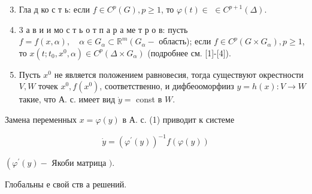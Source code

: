 \documentclass[10pt]{article}
\begin{document}
\begin{enumerate}

  \setcounter{enumi}{2}

  \item Гла д ко с т ь: если $f \in C^{p}(G), p \geqslant 1$, то $\varphi(t) \in$ $\in C^{p+1}(\Delta)$.



  \item 3 а в и и мо с т ь о т п а р а ме т р о в: пусть $f=f(x, \alpha), \quad \alpha \in G_{\alpha} \subset \mathbb{R}^{m}\left(G_{\alpha}-\right.$ область); если $f \in C^{p}\left(G \times G_{\alpha}\right), p \geqslant 1$, то $x\left(t ; t_{0}, x^{0}, \alpha\right) \in C^{p}\left(\Delta \times G_{\alpha}\right)$ (подробнее см. [1]-[4]).



  \item Пусть $x^{0}$ не является положением равновесия, тогда существуют окрестности $V, W$ точек $x^{0}, f\left(x^{0}\right)$, соответственно, и дифбеооморфииз $y=h(x): V \rightarrow W$ такие, что А. с. имеет вид $\dot{y}=$ const в $W$.



\end{enumerate}



Замена переменных $x=\varphi(y)$ в А. с. (1) приводит к системе



\[

\dot{y}=\left(\varphi^{\prime}(y)\right)^{-1} f(\varphi(y))

\]



$\left(\varphi^{\prime}(y)-\right.$ Якоби матрица $)$.



Глобальны е свой ств а решений.
\end{document}
